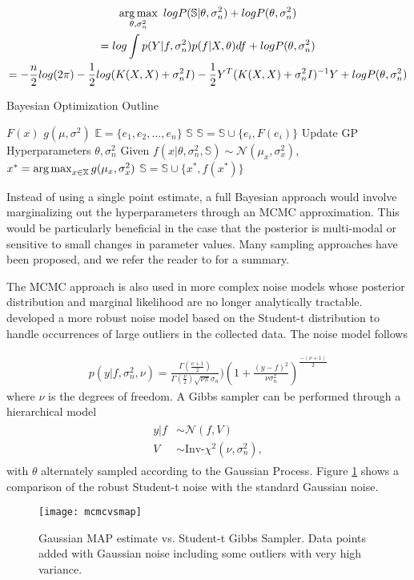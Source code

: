 \begin{gather}
\operatorname*{arg\,max}_{\theta, \sigma_n^2} \text{ } log P(\mathbb{S}\vert \theta, \sigma_n^2) + log P(\theta, \sigma_n^2)\\
=log \int p(Y\vert f, \sigma_n^2)p(f\vert X,\theta)df + log P(\theta, \sigma_n^2)\nonumber\\
= -\frac{n}{2}log(2\pi) - \frac{1}{2}log(K(X,X) + \sigma_n^2 I) - \frac{1}{2}Y^T(K(X,X) + \sigma_n^2 I)^{-1}Y + log P(\theta, \sigma_n^2)\nonumber
\end{gather}


\begin{algorithm}[t]
\caption{Bayesian Optimization Outline}
\label{alg:bayesopt}
\begin{algorithmic}
\State {} $F(x)$
\State {} $g(\mu, \sigma^2)$
\State {} $\mathbb{E} = \{e_1, e_2, ..., e_n\}$
\State {} $\mathbb{S}$
  \State $\mathbb{S} = \mathbb{S} \cup \{e_i, F(e_i)\}$
\End
{}
  \State Update GP Hyperparameters $\theta, \sigma_n^2$
  \State Given $f(x\vert \theta, \sigma_n^2, \mathbb{S}) \sim \mathcal{N}(\mu_x, \sigma_x^2)$,
  \State $x^* = \operatorname*{arg\,max}_{x \in \mathbb{X}} g(\mu_x, \sigma_x^2)$
  \State $\mathbb{S} = \mathbb{S} \cup \{x^*, f(x^*)\}$
\End
\end{algorithmic}
\end{algorithm}


Instead of using a single point estimate, a full Bayesian approach would involve marginalizing out the hyperparameters through an MCMC approximation. This would be particularly beneficial in the case that the posterior is multi-modal or sensitive to small changes in parameter values. Many sampling approaches have been proposed, and we refer the reader to \cite[Chapter~14]{barber2011bayesian} for a summary. 

The MCMC approach is also used in more complex noise models whose posterior distribution and marginal likelihood are no longer analytically tractable. \citet{NIPS2009_3806,Jylanki:2011:RGP:1953048.2078209} developed a more robust noise model based on the Student-t distribution to handle occurrences of large outliers in the collected data. The noise model follows

\begin{align}
p(y\vert f,\sigma_n^2,\nu) = \frac{\Gamma (\frac{\nu + 1}{2})}{\Gamma(\frac{\nu}{2})\sqrt{\nu\pi}\sigma_n})(1 + \frac{(y-f)^2}{\nu\sigma_n^2})^{\frac{-(\nu + 1)}{2}}
\end{align} 
where $\nu$ is the degrees of freedom. A Gibbs sampler can be performed through a hierarchical model
\begin{align}
\begin{split}
y\vert f &\sim \mathcal{N}(f, V)\\
V &\sim \text{Inv-}\chi^2(\nu, \sigma_n^2),
\end{split}
\end{align}
with $\theta$ alternately sampled according to the Gaussian Process. Figure \ref{fig:mcmcvsmap} shows a comparison of the robust Student-t noise with the standard Gaussian noise.

\begin{figure}[t]
\centering
\texttt{[image: mcmcvsmap]}
\caption{Gaussian MAP estimate vs. Student-t Gibbs Sampler. Data points added with Gaussian noise including some outliers with very high variance.}
\label{fig:mcmcvsmap}
\end{figure}
